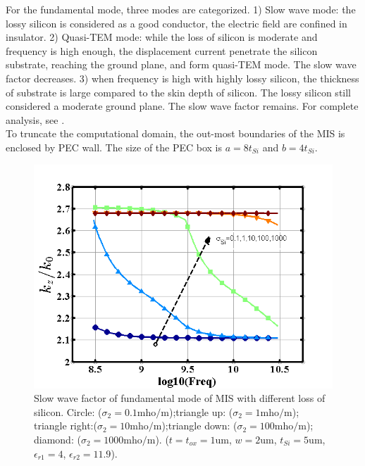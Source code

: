 \documentclass{pj}
\begin{document}
For the fundamental mode, three modes are categorized. 1) Slow wave mode: the lossy silicon is considered as a good conductor, the electric field are confined in insulator. 2) Quasi-TEM mode: while the loss of silicon is moderate and frequency is high enough, the displacement current penetrate the silicon substrate, reaching the ground plane, and form quasi-TEM mode. The slow wave factor decreases. 3) when frequency is high with highly lossy silicon, the thickness of substrate is large compared to the skin depth of silicon. The lossy silicon still considered a moderate ground plane. The slow wave factor remains. For complete analysis, see \cite{ITMTT_KiangJF_KiangJF_1996_quasitem_analysis,ITMTT_WilliamsDF_WilliamsDF_1999_metalinsulatorsemiconductor_transmission}. \\

To truncate the computational domain, the out-most boundaries of the MIS is enclosed by PEC wall. The size of the PEC box is $a=8t_{Si}$ and $b=4t_{Si}$. \\

\begin{figure}[htbp]
	\centering
	\includegraphics[width=\defaultfigurewidth]{./img/mis/mis_disp.png}
	\caption{Slow wave factor of fundamental mode of MIS with different loss of silicon. Circle: ($\sigma_2=0.1 \mathrm{ mho/m}$);triangle up: ($\sigma_2=1 \mathrm{ mho/m}$); triangle right:($\sigma_2=10 \mathrm{ mho/m}$);triangle down: ($\sigma_2=100 \mathrm{ mho/m}$); diamond: ($\sigma_2=1000 \mathrm{ mho/m}$). ($t=t_{ox}=1\mathrm{um}$, $w=2\mathrm{um}$, $t_{Si}=5\mathrm{um}$, $\epsilon_{r1} = 4$, $\epsilon_{r2} = 11.9$).}
	\label{fig:mis_dispersion}
\end{figure}
\end{document}
